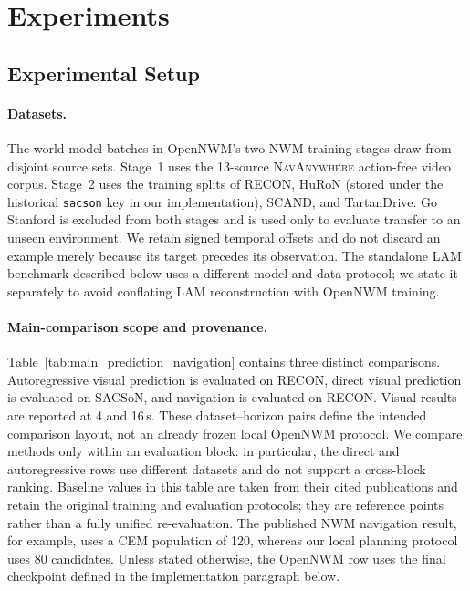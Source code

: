 
\section{Experiments}
\label{sec:experiments}

\subsection{Experimental Setup}

\paragraph{Datasets.}
The world-model batches in OpenNWM's two NWM training stages draw from
disjoint source sets.  Stage~1 uses the 13-source \textsc{NavAnywhere}
action-free video corpus.  Stage~2 uses the training splits of RECON, HuRoN
(stored under the historical \texttt{sacson} key in our implementation),
SCAND, and TartanDrive.  Go Stanford is excluded from both stages and is used
only to evaluate transfer to an unseen environment.  We retain signed temporal
offsets and do not discard an example merely because its target precedes its
observation.  The standalone LAM benchmark described below uses a different
model and data protocol; we state it separately to avoid conflating LAM
reconstruction with OpenNWM training.

\paragraph{Main-comparison scope and provenance.}
Table~\ref{tab:main_prediction_navigation} contains three distinct comparisons.
Autoregressive visual prediction is evaluated on RECON, direct visual
prediction is evaluated on SACSoN, and navigation is evaluated on RECON.
Visual results are reported at 4 and 16\,s.  These dataset--horizon pairs
define the intended comparison layout, not an already frozen local OpenNWM
protocol.  We compare methods only within an evaluation block: in particular,
the direct and autoregressive rows use different datasets and do not support a
cross-block ranking.  Baseline values in this table are taken from their cited
publications and retain the original training and evaluation protocols; they
are reference points rather than a fully unified re-evaluation.  The published
NWM navigation result, for example, uses a CEM population of 120, whereas our
local planning protocol uses 80 candidates.  Unless stated otherwise, the
OpenNWM row uses the final checkpoint defined in the implementation paragraph
below.

